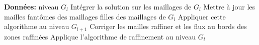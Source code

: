 \begin{algorithmic}
    \STATE \textbf{Données:} niveau \(G_l\)
    \STATE Intégrer la solution sur les maillages de \(G_l\)
    \STATE Mettre à jour les mailles fantômes des maillages filles des maillages de \(G_l\)
    \STATE Appliquer cette algorithme au niveau \(G_{l+1}\)
    \STATE Corriger les mailles raffiner et les flux au bords des zones raffinées
    \STATE Applique l'algorithme de raffinement au niveau \(G_l\)
    \ENDIF
\end{algorithmic}